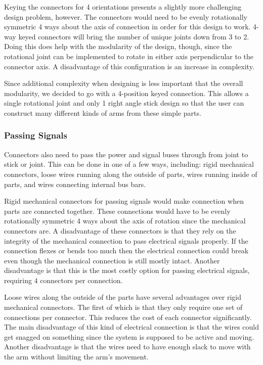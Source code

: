 \noindent Keying the connectors for 4 orientations presents a slightly more challenging design problem, however. The connectors would need to be evenly rotationally symmetric 4 ways about the axis of connection in order for this design to work. 4-way keyed connectors will bring the number of unique joints down from 3 to 2. Doing this does help with the modularity of the design, though, since the rotational joint can be implemented to rotate in either axis perpendicular to the connector axis. A disadvantage of this configuration is an increase in complexity. 

\noindent Since additional complexity when designing is less important that the overall modularity, we decided to go with a 4-position keyed connection. This allows a single rotational joint and only 1 right angle stick design so that the user can construct many different kinds of arms from these simple parts.

\subsubsection{Passing Signals}
Connectors also need to pass the power and signal buses through from joint to stick or joint. This can be done in one of a few ways, including: rigid mechanical connectors, loose wires running along the outside of parts, wires running inside of parts, and wires connecting internal bus bars.

\noindent Rigid mechanical connectors for passing signals would make connection when parts are connected together. These connections would have to be evenly rotationally symmetric 4 ways about the axis of rotation since the mechanical connectors are. A disadvantage of these connectors is that they rely on the integrity of the mechanical connection to pass electrical signals properly. If the connection flexes or bends too much then the electrical connection could break even though the mechanical connection is still mostly intact. Another disadvantage is that this is the most costly option for passing electrical signals, requiring 4 connectors per connection. 

\noindent Loose wires along the outside of the parts have several advantages over rigid mechanical connectors. The first of which is that they only require one set of connections per connector. This reduces the cost of each connector significantly. The main disadvantage of this kind of electrical connection is that the wires could get snagged on something since the system is supposed to be active and moving. Another disadvantage is that the wires need to have enough slack to move with the arm without limiting the arm's movement.  

